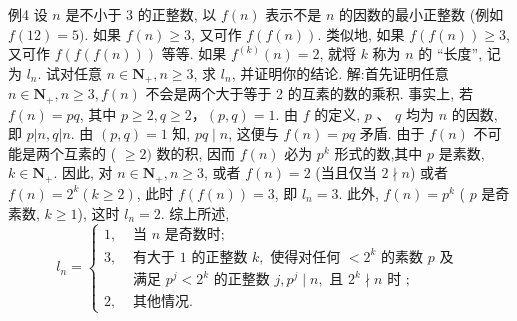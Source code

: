 例4 设 $n$ 是不小于 3 的正整数, 以 $f(n)$ 表示不是 $n$ 的因数的最小正整数 (例如 $f(12)=5)$. 如果 $f(n) \geqslant 3$, 又可作 $f(f(n))$. 类似地, 如果 $f(f(n)) \geqslant 3$, 又可作 $f(f(f(n)))$ 等等.
如果 $f^{(k)}(n)=2$, 就将 $k$ 称为 $n$ 的 “长度”, 记为 $l_n$. 试对任意 $n \in \mathbf{N}_{+}, n \geqslant 3$, 求 $l_n$, 并证明你的结论.
解:首先证明任意 $n \in \mathbf{N}_{+}, n \geqslant 3, f(n)$ 不会是两个大于等于 2 的互素的数的乘积.
事实上, 若 $f(n)=p q$, 其中 $p \geqslant 2, q \geqslant 2 ，(p, q)=1$. 由 $f$ 的定义, $p$ 、 $q$ 均为 $n$ 的因数, 即 $p|n, q| n$. 由 $(p, q)=1$ 知, $p q \mid n$, 这便与 $f(n)= p q$ 矛盾.
由于 $f(n)$ 不可能是两个互素的 ( $\geqslant 2)$ 数的积, 因而 $f(n)$ 必为 $p^k$ 形式的数,其中 $p$ 是素数, $k \in \mathbf{N}_{+}$.
因此, 对 $n \in \mathbf{N}_{+}, n \geqslant 3$, 或者 $f(n)=2$ (当且仅当 $2 \nmid n$) 或者 $f(n)=2^k(k \geqslant 2)$, 此时 $f(f(n))=3$, 即 $l_n=3$. 此外, $f(n)=p^k$ ( $p$ 是奇素数, $k \geqslant 1$), 这时 $l_n=2$.
综上所述,
$$
l_n= \begin{cases}1, & \text { 当 } n \text { 是奇数时; } \\ 3, & \text { 有大于 } 1 \text { 的正整数 } k, \text { 使得对任何 }<2^k \text { 的素数 } p \text { 及 } \\ & \text { 满足 } p^j<2^k \text { 的正整数 } j, p^j \mid n, \text { 且 } 2^k \nmid n \text { 时 ; } \\ 2, & \text { 其他情况.
}\end{cases}
$$



